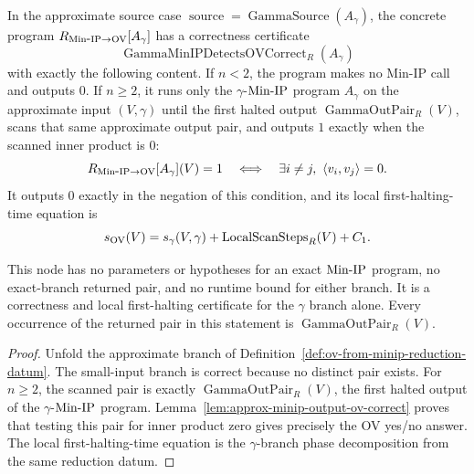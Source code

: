 \begin{lemma}
  \label{lem:gamma-minip-detects-ov-correctness-certificate}
  In the approximate source case
  $\operatorname{source}=\operatorname{GammaSource}(A_{\gamma})$, the concrete
  program $R_{\mathrm{Min\mbox{-}IP}\to\mathrm{OV}}[A_{\gamma}]$ has a correctness certificate
  \[
    \operatorname{GammaMinIPDetectsOVCorrect}_R(A_{\gamma})
  \]
  with exactly the following content.  If $n<2$, the program makes no Min-IP
  call and outputs $0$.  If $n\geq2$, it runs only the $\gamma$-$\mathrm{Min\mbox{-}IP}$
  program $A_{\gamma}$ on the approximate input $(V,\gamma)$ until the first
  halted output $\operatorname{GammaOutPair}_R(V)$, scans that same approximate
  output pair, and outputs $1$ exactly when the scanned inner product is $0$:
  \[
    R_{\mathrm{Min\mbox{-}IP}\to\mathrm{OV}}[A_{\gamma}](V)=1
      \quad\Longleftrightarrow\quad
    \exists i\neq j,\ \left\langle v_i,v_j\right\rangle=0.
  \]
  It outputs $0$ exactly in the negation of this condition, and its local
  first-halting-time equation is
  \[
    s_{\mathrm{OV}}(V)=s_{\gamma}(V,\gamma)
      +\operatorname{LocalScanSteps}_R(V)+C_1.
  \]

  This node has no parameters or hypotheses for an exact $\mathrm{Min\mbox{-}IP}$ program, no
  exact-branch returned pair, and no runtime bound for either branch.  It is a
  correctness and local first-halting certificate for the $\gamma$ branch
  alone.  Every occurrence of the returned pair in this statement is
  $\operatorname{GammaOutPair}_R(V)$.
\end{lemma}
\begin{proof}
  Unfold the approximate branch of
  Definition~\ref{def:ov-from-minip-reduction-datum}.  The small-input branch
  is correct because no distinct pair exists.  For $n\geq2$, the scanned pair
  is exactly $\operatorname{GammaOutPair}_R(V)$, the first halted output of the
  $\gamma$-$\mathrm{Min\mbox{-}IP}$ program.  Lemma~\ref{lem:approx-minip-output-ov-correct}
  proves that testing this pair for inner product zero gives precisely the OV
  yes/no answer.  The local first-halting-time equation is the $\gamma$-branch
  phase decomposition from the same reduction datum.
\end{proof}

